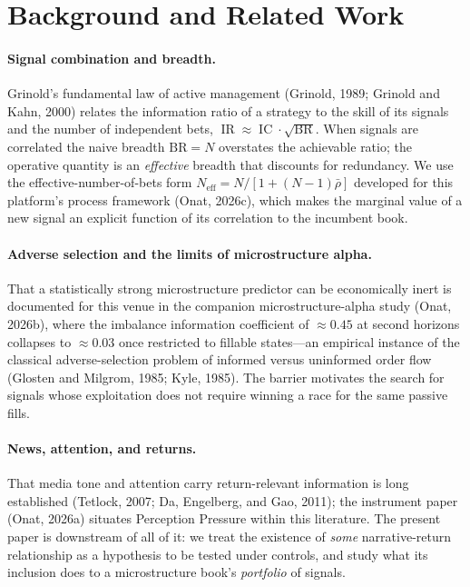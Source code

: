 \documentclass[11pt,a4paper]{article}
\theoremstyle{definition}
\theoremstyle{plain}
\DeclareMathOperator{\IC}{IC}
\DeclareMathOperator{\IR}{IR}
\begin{document}
\section{Background and Related Work}
\label{sec:related}

\paragraph{Signal combination and breadth.}
Grinold's fundamental law of active management (Grinold, 1989; Grinold and Kahn, 2000) relates the
information ratio of a strategy to the skill of its signals and the number of independent bets,
$\IR \approx \IC\cdot\sqrt{\mathrm{BR}}$. When signals are correlated the naive breadth $\mathrm{BR}=N$
overstates the achievable ratio; the operative quantity is an \emph{effective} breadth that discounts
for redundancy. We use the effective-number-of-bets form
$N_{\mathrm{eff}}=N/[1+(N-1)\bar\rho]$ developed for this platform's process framework (Onat, 2026c),
which makes the marginal value of a new signal an explicit function of its correlation to the
incumbent book.

\paragraph{Adverse selection and the limits of microstructure alpha.}
That a statistically strong microstructure predictor can be economically inert is documented for this
venue in the companion microstructure-alpha study (Onat, 2026b), where the imbalance information
coefficient of $\approx 0.45$ at second horizons collapses to $\approx 0.03$ once restricted to
fillable states---an empirical instance of the classical adverse-selection problem of informed versus
uninformed order flow (Glosten and Milgrom, 1985; Kyle, 1985). The barrier motivates the search for
signals whose exploitation does not require winning a race for the same passive fills.

\paragraph{News, attention, and returns.}
That media tone and attention carry return-relevant information is long established (Tetlock, 2007;
Da, Engelberg, and Gao, 2011); the instrument paper (Onat, 2026a) situates Perception Pressure within
this literature. The present paper is downstream of all of it: we treat the existence of \emph{some}
narrative-return relationship as a hypothesis to be tested under controls, and study what its
inclusion does to a microstructure book's \emph{portfolio} of signals.
\end{document}
